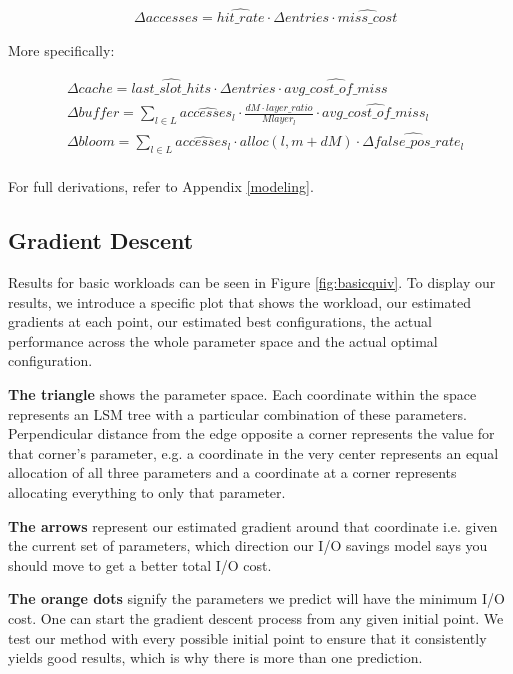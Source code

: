 \documentclass{cidr-2019}
\begin{document}
\begin{align*}
    &\Delta accesses = \widehat{hit\_rate}\cdot \Delta{entries} \cdot\widehat{miss\_cost}
\end{align*}

More specifically:

\begin{align*}
    &\Delta cache = \widehat{last\_slot\_hits} \cdot \Delta{entries} \cdot  \widehat{avg\_cost\_of\_miss} \\
    &\Delta buffer = \sum_{l\in L} \widehat{accesses_{l}} \cdot \frac{dM \cdot {layer\_ratio}}{Mlayer_{l}} \cdot \widehat{avg\_cost\_of\_miss_{l}}\\
    &\Delta bloom = \sum_{l\in L} \widehat{accesses_{l}} \cdot alloc(l, m+dM) \cdot \widehat{\Delta false\_pos\_rate_{l}}\\
\end{align*}

For full derivations, refer to Appendix \ref{modeling}.

\subsection{Gradient Descent}

Results for basic workloads can be seen in Figure \ref{fig:basicquiv}. To
display our results, we introduce a specific plot that shows the workload, our
estimated gradients at each point, our estimated best configurations, the
actual performance across the whole parameter space and the actual optimal
configuration.

\textbf{The triangle} shows the parameter space. Each coordinate within the
space represents an LSM tree with a particular combination of these parameters.
Perpendicular distance from the edge opposite a corner represents the value for
that corner's parameter, e.g. a coordinate in the very center represents an
equal allocation of all three parameters and a coordinate at a corner
represents allocating everything to only that parameter.

\textbf{The arrows} represent our estimated gradient around that coordinate
i.e. given the current set of parameters, which direction our I/O savings model
says you should move to get a better total I/O cost.

\textbf{The orange dots} signify the parameters we predict will have the
minimum I/O cost.  One can start the gradient descent process from any given
initial point. We test our method with every possible initial point to ensure
that it consistently yields good results, which is why there is more than one
prediction.
\end{document}
